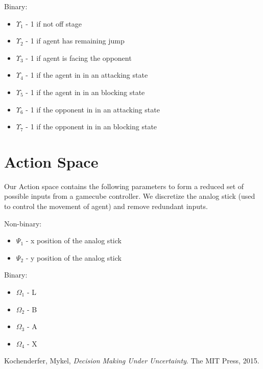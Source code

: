 \documentclass[11pt]{article}
\begin{document}
\vspace{2mm}

Binary:
\begin{itemize}
\item $\Upsilon_{1}$ - 1 if not off stage
\item $\Upsilon_{2}$ - 1 if agent has remaining jump
\item $\Upsilon_{3}$ - 1 if agent is facing the opponent
\item $\Upsilon_{4}$ - 1 if the agent in in an attacking state
\item $\Upsilon_{5}$ - 1 if the agent in in an blocking state
\item $\Upsilon_{6}$ - 1 if the opponent in in an attacking state
\item $\Upsilon_{7}$ - 1 if the opponent in in an blocking state
\end{itemize}


\section{Action Space}
Our Action space contains the following parameters to form a reduced set of possible inputs from a gamecube controller. We discretize the analog stick (used to control the movement of agent) and remove redundant inputs.  

\vspace{2mm}

Non-binary:

\begin{itemize}
\item $\Psi_{1}$ - x position of the analog stick
\item $\Psi_{2}$ - y position of the analog stick
\end{itemize}

\vspace{2mm}

Binary:

\begin{itemize}
\item $\Omega_{1}$ - L 
\item $\Omega_{2}$ - B
\item $\Omega_{3}$ - A
\item $\Omega_{4}$ - X
\end{itemize}

\begin{thebibliography}{999}
	Kochenderfer, Mykel,
	\emph{Decision Making Under Uncertainty}.
	The MIT Press, 2015.

\end{thebibliography}
\end{document}
